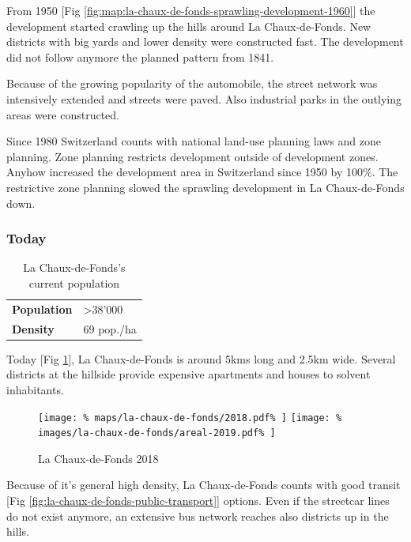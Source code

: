 \documentclass{article}
\begin{document}
\begin{multicols}{2}
			From 1950 [Fig \ref{fig:map:la-chaux-de-fonds-sprawling-development-1960}] the development started crawling up the hills around La Chaux-de-Fonds.
			New districts with big yards and lower density were constructed fast.
			The development did not follow anymore the planned pattern from 1841.
			
			
			Because of the growing popularity of the automobile, the street network was intensively extended and streets were paved.
			Also industrial parks in the outlying areas were constructed.
			
			Since 1980 Switzerland counts with national land-use planning laws and zone planning. Zone planning restricts development outside of development zones. Anyhow increased the development area in Switzerland since 1950 by 100\%.
			The restrictive zone planning slowed the sprawling development in La Chaux-de-Fonds down.
			
			
			\subsubsection{Today}			
			
			\begin{table}[H]			
				\centering
				\caption{La Chaux-de-Fonds's current population}
				\label{table:la-chaux-de-fonds-population}
				\begin{tabular}{|l|l|}
					\hline
					\textbf{Population}  & \textgreater 38'000 \\
					\textbf{Density}     & 69 pop./ha \\
					\hline
				\end{tabular}
			\end{table}
			
			Today [Fig \ref{fig:map:la-chaux-de-fonds-2018}], La Chaux-de-Fonds is around 5kms long and 2.5km wide. Several districts at the hillside provide expensive apartments and houses to solvent inhabitants.
			
			\begin{figure}[H]
				\texttt{[image: \%
					maps/la-chaux-de-fonds/2018.pdf\%
				]}
				\texttt{[image: \%
					images/la-chaux-de-fonds/areal-2019.pdf\%
				]}
				\caption{La Chaux-de-Fonds 2018  \cite{MapGeoAdmin:LaChauxDeFonds}}
				\label{fig:map:la-chaux-de-fonds-2018}
			\end{figure}
			
			Because of it's general high density, La Chaux-de-Fonds counts with good transit [Fig \ref{fig:la-chaux-de-fonds-public-transport}] options. Even if the streetcar lines do not exist anymore, an extensive bus network reaches also districts up in the hills.
			

\end{multicols}
\end{document}

